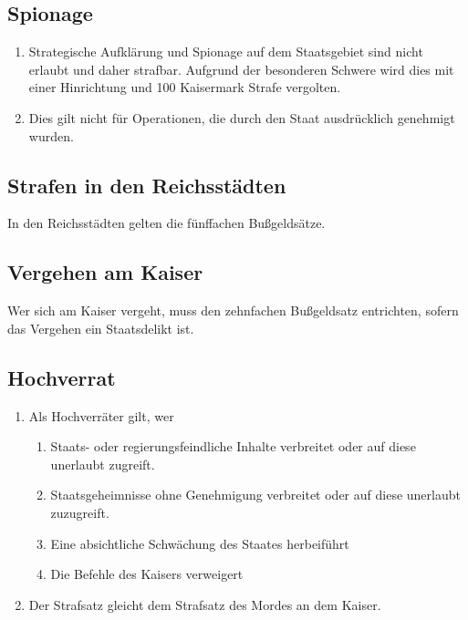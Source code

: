 \documentclass{article}
\begin{document}
\subsection{Spionage}
\begin{enumerate}[(1)]
    \item Strategische Aufklärung und Spionage auf dem Staatsgebiet sind nicht erlaubt und daher strafbar. Aufgrund der besonderen Schwere wird dies mit einer Hinrichtung und 100 Kaisermark Strafe vergolten.
    \item Dies gilt nicht für Operationen, die durch den Staat ausdrücklich genehmigt wurden. 
\end{enumerate}

\subsection{Strafen in den Reichsstädten}
In den Reichsstädten gelten die fünffachen Bußgeldsätze.

\subsection{Vergehen am Kaiser}
Wer sich am Kaiser vergeht, muss den zehnfachen Bußgeldsatz entrichten, sofern das Vergehen ein Staatsdelikt ist.


\subsection{Hochverrat}
\begin{enumerate}[(1)]
    \item Als Hochverräter gilt, wer
    \begin{enumerate}[1.]
        \item Staats- oder regierungsfeindliche Inhalte verbreitet oder auf diese unerlaubt zugreift.
        \item Staatsgeheimnisse ohne Genehmigung verbreitet oder auf diese unerlaubt zuzugreift.
        \item Eine absichtliche Schwächung des Staates herbeiführt
        \item Die Befehle des Kaisers verweigert
    \end{enumerate}
    \item Der Strafsatz gleicht dem Strafsatz des Mordes an dem Kaiser.
\end{enumerate}
\end{document}
